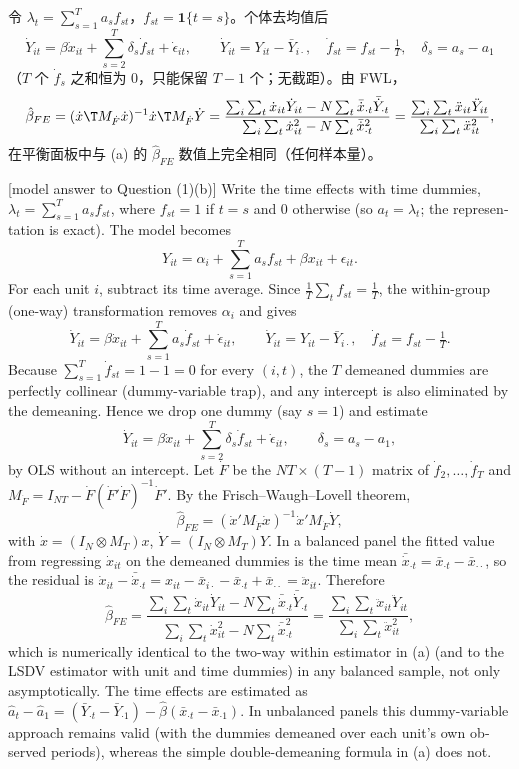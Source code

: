 \begin{thm}[第 1(b) 题答案]
令 $\lambda_t=\sum_{s=1}^Ta_sf_{st}$，$f_{st}=\mathbf{1}\{t=s\}$。个体去均值后
\[
\dot Y_{it}=\beta\dot x_{it}+\sum_{s=2}^T\delta_s\dot f_{st}+\dot\epsilon_{it},\qquad \dot Y_{it}=Y_{it}-\bar Y_{i\cdot},\quad \dot f_{st}=f_{st}-\tfrac1T,\quad \delta_s=a_s-a_1
\]
（$T$ 个 $\dot f_s$ 之和恒为 0，只能保留 $T-1$ 个；无截距）。由 FWL，
\[
\hat\beta_{FE}=(\dot x\T M_{\dot F}\dot x)^{-1}\dot x\T M_{\dot F}\dot Y
=\frac{\sum_i\sum_t\dot x_{it}\dot Y_{it}-N\sum_t\bar{\dot x}_{\cdot t}\bar{\dot Y}_{\cdot t}}{\sum_i\sum_t\dot x_{it}^2-N\sum_t\bar{\dot x}_{\cdot t}^2}
=\frac{\sum_i\sum_t\ddot x_{it}\ddot Y_{it}}{\sum_i\sum_t\ddot x_{it}^2},
\]
在平衡面板中与 (a) 的 $\hat\beta_{FE}$ 数值上完全相同（任何样本量）。
\end{thm}

\begin{english}[model answer to Question (1)(b)]
Write the time effects with time dummies, $\lambda_t=\sum_{s=1}^Ta_sf_{st}$, where $f_{st}=1$ if $t=s$ and 0 otherwise (so $a_t=\lambda_t$; the representation is exact). The model becomes
\[
Y_{it}=\alpha_i+\sum_{s=1}^Ta_sf_{st}+\beta x_{it}+\epsilon_{it}.
\]
For each unit $i$, subtract its time average. Since $\frac1T\sum_tf_{st}=\frac1T$, the within-group (one-way) transformation removes $\alpha_i$ and gives
\[
\dot Y_{it}=\beta\dot x_{it}+\sum_{s=1}^Ta_s\dot f_{st}+\dot\epsilon_{it},\qquad \dot Y_{it}=Y_{it}-\bar Y_{i\cdot},\quad \dot f_{st}=f_{st}-\tfrac1T.
\]
Because $\sum_{s=1}^T\dot f_{st}=1-1=0$ for every $(i,t)$, the $T$ demeaned dummies are perfectly collinear (dummy-variable trap), and any intercept is also eliminated by the demeaning. Hence we drop one dummy (say $s=1$) and estimate
\[
\dot Y_{it}=\beta\dot x_{it}+\sum_{s=2}^T\delta_s\dot f_{st}+\dot\epsilon_{it},\qquad \delta_s=a_s-a_1,
\]
by OLS without an intercept. Let $\dot F$ be the $NT\times(T-1)$ matrix of $\dot f_2,\dots,\dot f_T$ and $M_{\dot F}=I_{NT}-\dot F(\dot F'\dot F)^{-1}\dot F'$. By the Frisch--Waugh--Lovell theorem,
\[
\hat\beta_{FE}=(\dot x'M_{\dot F}\dot x)^{-1}\dot x'M_{\dot F}\dot Y,
\]
with $\dot x=(I_N\otimes M_T)x$, $\dot Y=(I_N\otimes M_T)Y$. In a balanced panel the fitted value from regressing $\dot x_{it}$ on the demeaned dummies is the time mean $\bar{\dot x}_{\cdot t}=\bar x_{\cdot t}-\bar x_{\cdot\cdot}$, so the residual is $\dot x_{it}-\bar{\dot x}_{\cdot t}=x_{it}-\bar x_{i\cdot}-\bar x_{\cdot t}+\bar x_{\cdot\cdot}=\ddot x_{it}$. Therefore
\[
\hat\beta_{FE}=\frac{\sum_i\sum_t\dot x_{it}\dot Y_{it}-N\sum_t\bar{\dot x}_{\cdot t}\bar{\dot Y}_{\cdot t}}{\sum_i\sum_t\dot x_{it}^2-N\sum_t\bar{\dot x}_{\cdot t}^2}=\frac{\sum_i\sum_t\ddot x_{it}\ddot Y_{it}}{\sum_i\sum_t\ddot x_{it}^2},
\]
which is numerically identical to the two-way within estimator in (a) (and to the LSDV estimator with unit and time dummies) in any balanced sample, not only asymptotically. The time effects are estimated as $\hat a_t-\hat a_1=(\bar Y_{\cdot t}-\bar Y_{\cdot1})-\hat\beta(\bar x_{\cdot t}-\bar x_{\cdot1})$. In unbalanced panels this dummy-variable approach remains valid (with the dummies demeaned over each unit's own observed periods), whereas the simple double-demeaning formula in (a) does not.
\end{english}

